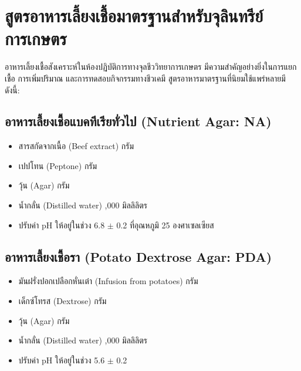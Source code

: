 \chapter{สูตรอาหารเลี้ยงเชื้อมาตรฐานสำหรับจุลินทรีย์การเกษตร}
\label{app:media_recipes}

อาหารเลี้ยงเชื้อสังเคราะห์ในห้องปฏิบัติการทางจุลชีววิทยาการเกษตร มีความสำคัญอย่างยิ่งในการแยกเชื้อ การเพิ่มปริมาณ และการทดสอบกิจกรรมทางชีวเคมี สูตรอาหารมาตรฐานที่นิยมใช้แพร่หลายมีดังนี้:

\section{อาหารเลี้ยงเชื้อแบคทีเรียทั่วไป (Nutrient Agar: NA)}
\begin{itemize}
    \item สารสกัดจากเนื้อ (Beef extract)  กรัม
    \item เปปโทน (Peptone)  กรัม
    \item วุ้น (Agar)  กรัม
    \item น้ำกลั่น (Distilled water) ,000 มิลลิลิตร
    \item ปรับค่า pH ให้อยู่ในช่วง 6.8 $\pm$ 0.2 ที่อุณหภูมิ 25 องศาเซลเซียส
\end{itemize}

\section{อาหารเลี้ยงเชื้อรา (Potato Dextrose Agar: PDA)}
\begin{itemize}
    \item มันฝรั่งปอกเปลือกหั่นเต๋า (Infusion from potatoes)  กรัม
    \item เด็กซ์โทรส (Dextrose)  กรัม
    \item วุ้น (Agar)  กรัม
    \item น้ำกลั่น (Distilled water) ,000 มิลลิลิตร
    \item ปรับค่า pH ให้อยู่ในช่วง 5.6 $\pm$ 0.2
\end{itemize}

